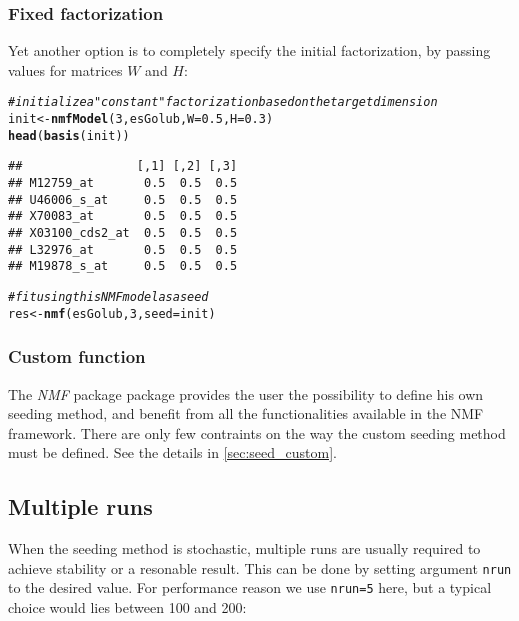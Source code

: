 \documentclass[a4paper]{article}\usepackage[]{graphicx}\usepackage[]{color}
\makeatletter
\newcommand{\hlnum}[1]{\textcolor[rgb]{0.686,0.059,0.569}{#1}}%
\newcommand{\hlcom}[1]{\textcolor[rgb]{0.678,0.584,0.686}{\textit{#1}}}%
\newcommand{\hlstd}[1]{\textcolor[rgb]{0.345,0.345,0.345}{#1}}%
\newcommand{\hlkwb}[1]{\textcolor[rgb]{0.69,0.353,0.396}{#1}}%
\newcommand{\hlkwc}[1]{\textcolor[rgb]{0.333,0.667,0.333}{#1}}%
\newcommand{\hlkwd}[1]{\textcolor[rgb]{0.737,0.353,0.396}{\textbf{#1}}}%
\newenvironment{kframe}{%
 \def\at@end@of@kframe{}%
 \ifinner\ifhmode%
  \def\at@end@of@kframe{\end{minipage}}%
  \begin{minipage}{\columnwidth}%
 \fi\fi%
 \def\FrameCommand##1{\hskip\@totalleftmargin \hskip-\fboxsep
 \colorbox{shadecolor}{##1}\hskip-\fboxsep
     \hskip-\linewidth \hskip-\@totalleftmargin \hskip\columnwidth}%
 \MakeFramed {\advance\hsize-\width
   \@totalleftmargin\z@ \linewidth\hsize
   \@setminipage}}%
 {\par\unskip\endMakeFramed%
 \at@end@of@kframe}
\newenvironment{knitrout}{}{} %
\let\code=\texttt
\newcommand{\pkgname}[1]{\textit{#1}\xspace}
\newcommand{\Rpkg}[1]{\pkgname{#1} package\xspace}
\newcommand{\nmfpack}{\Rpkg{NMF}}
\makeatother
\begin{document}
\subsubsection{Fixed factorization}
Yet another option is to completely specify the initial factorization, by passing values for matrices $W$ and $H$:
\begin{knitrout}
\color{fgcolor}\begin{kframe}
\begin{alltt}
\hlcom{# initialize a "constant" factorization based on the target dimension}
\hlstd{init} \hlkwb{<-} \hlkwd{nmfModel}\hlstd{(}\hlnum{3}\hlstd{, esGolub,} \hlkwc{W}\hlstd{=}\hlnum{0.5}\hlstd{,} \hlkwc{H}\hlstd{=}\hlnum{0.3}\hlstd{)}
\hlkwd{head}\hlstd{(}\hlkwd{basis}\hlstd{(init))}
\end{alltt}
\begin{verbatim}
##                [,1] [,2] [,3]
## M12759_at       0.5  0.5  0.5
## U46006_s_at     0.5  0.5  0.5
## X70083_at       0.5  0.5  0.5
## X03100_cds2_at  0.5  0.5  0.5
## L32976_at       0.5  0.5  0.5
## M19878_s_at     0.5  0.5  0.5
\end{verbatim}
\begin{alltt}
\hlcom{# fit using this NMF model as a seed}
\hlstd{res} \hlkwb{<-} \hlkwd{nmf}\hlstd{(esGolub,} \hlnum{3}\hlstd{,} \hlkwc{seed}\hlstd{=init)}
\end{alltt}
\end{kframe}
\end{knitrout}


\subsubsection{Custom function}
The \nmfpack package provides the user the possibility to define his own seeding method, and benefit from all the functionalities available in the NMF framework.
There are only few contraints on the way the custom seeding method must be defined.
See the details in \cref{sec:seed_custom}.

\subsection{Multiple runs}

When the seeding method is stochastic, multiple runs are usually required to achieve stability or a resonable result.
This can be done by setting argument \code{nrun} to the desired value. 
For performance reason we use \code{nrun=5} here, but a typical choice would lies between 100 and 200:  
\end{document}
